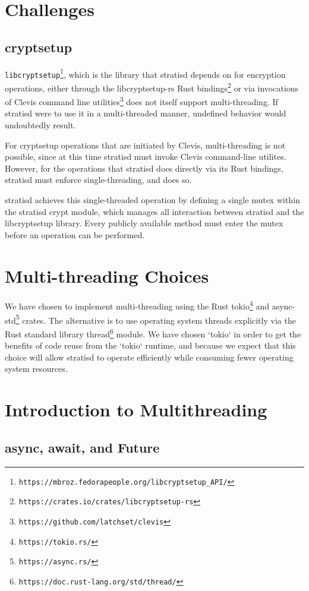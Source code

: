 \documentclass[]{article}
\begin{document}
\section{Challenges}
\subsection{cryptsetup}
\texttt{libcryptsetup}\footnote{\texttt{https://mbroz.fedorapeople.org/libcryptsetup\_API/}}, which is the library that stratisd depends on for encryption operations, either through the libcryptsetup-rs Rust bindings\footnote{\texttt{https://crates.io/crates/libcryptsetup-rs}} or via invocations of Clevis command line utilities\footnote{\texttt{https://github.com/latchset/clevis}} does not itself support multi-threading. If stratisd were to use it in a multi-threaded manner, undefined behavior would undoubtedly result.

For cryptsetup operations that are initiated by Clevis, multi-threading is not possible, since at this time stratisd must invoke Clevis command-line utilites. However, for the operations that stratisd does directly via its Rust bindings, stratisd must enforce single-threading, and does so.

stratisd achieves this single-threaded operation by defining a single mutex within the stratisd crypt module, which manages all interaction between stratisd and the libcryptsetup library. Every publicly available method must enter the mutex before an operation can be performed.

\section{Multi-threading Choices}
We have chosen to implement multi-threading using the Rust tokio\footnote{\texttt{https://tokio.rs/}} and async-std\footnote{\texttt{https://async.rs/}} crates. The alternative is to use operating system threads explicitly via the Rust standard library thread\footnote{\texttt{https://doc.rust-lang.org/std/thread/}} module. We have chosen `tokio` in order to get the benefits of code reuse from the `tokio` runtime, and because we expect that this choice will allow stratisd to operate efficiently while consuming fewer operating system resources.

\section{Introduction to Multithreading}
\subsection{async, await, and Future}
\end{document}
